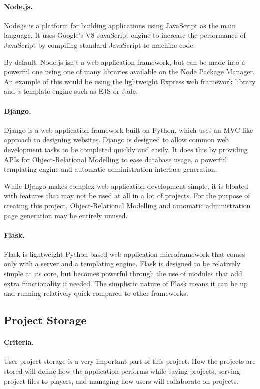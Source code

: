 \paragraph{Node.js.}
Node.js is a platform for building applications using JavaScript as the main language. It uses Google's V8 JavaScript engine to increase the performance of JavaScript by compiling standard JavaScript to machine code.\cite{nodejs}

By default, Node.js isn't a web application framework, but can be made into a powerful one using one of many libraries available on the Node Package Manager.\cite{npmjs} An example of this would be using the lightweight Express web framework library and a template engine such as EJS or Jade.

\paragraph{Django.}
Django is a web application framework built on Python, which uses an MVC-like approach to designing websites.\cite{django} Django is designed to allow common web development tasks to be completed quickly and easily. It does this by providing APIs for Object-Relational Modelling to ease database usage, a powerful templating engine and automatic administration interface generation.\cite{djangooverview}

While Django makes complex web application development simple, it is bloated with features that may not be used at all in a lot of projects. For the purpose of creating this project, Object-Relational Modelling and automatic administration page generation may be entirely unused. 

\paragraph{Flask.}
Flask is lightweight Python-based web application microframework that comes only with a server and a templating engine. Flask is designed to be relatively simple at its core, but becomes powerful through the use of modules that add extra functionality if needed.\cite{flask} The simplistic nature of Flask means it can be up and running relatively quick compared to other frameworks.

\subsection{Project Storage}
\paragraph{Criteria.}
User project storage is a very important part of this project. How the projects are stored will define how the application performs while saving projects, serving project files to players, and managing how users will collaborate on projects.

